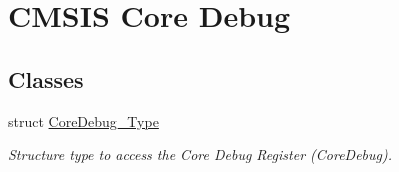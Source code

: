 \hypertarget{group___c_m_s_i_s___core_debug}{\section{\-C\-M\-S\-I\-S \-Core \-Debug}
\label{group___c_m_s_i_s___core_debug}
}
\subsection*{\-Classes}
\begin{DoxyCompactItemize}
\item 
struct \hyperlink{struct_core_debug___type}{\-Core\-Debug\-\_\-\-Type}
\begin{DoxyCompactList}\small\item\em \-Structure type to access the \-Core \-Debug \-Register (\-Core\-Debug). \end{DoxyCompactList}\end{DoxyCompactItemize}
